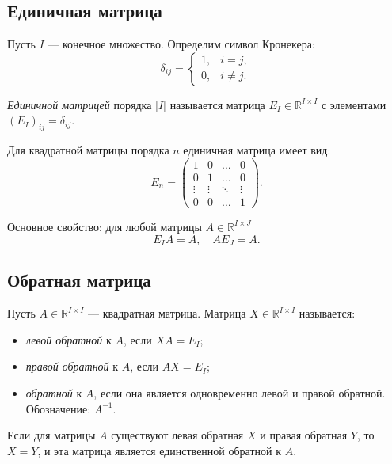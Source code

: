 \documentclass[a4paper,12pt]{article}
\theoremstyle{definition}
\theoremstyle{plain}
\theoremstyle{remark}
\begin{document}
	\subsection{Единичная матрица}
	
	Пусть \( I \) — конечное множество. Определим символ Кронекера:
	\[
	\delta_{ij} = 
	\begin{cases}
		1, & i = j, \\
		0, & i \neq j.
	\end{cases}
	\]
	
	\begin{tcolorbox}[colback=yellow!5, colframe=orange!50!black, title=Определение]
		\textit{Единичной матрицей} порядка \( |I| \) называется матрица \( E_I \in \mathbb{R}^{I \times I} \) с элементами \( (E_I)_{ij} = \delta_{ij} \).
	\end{tcolorbox}
	
	Для квадратной матрицы порядка \( n \) единичная матрица имеет вид:
	\[
	E_n = 
	\begin{pmatrix}
		1 & 0 & \dots & 0 \\
		0 & 1 & \dots & 0 \\
		\vdots & \vdots & \ddots & \vdots \\
		0 & 0 & \dots & 1
	\end{pmatrix}.
	\]
	
	Основное свойство: для любой матрицы \( A \in \mathbb{R}^{I \times J} \)
	\[
	E_I A = A, \quad A E_J = A.
	\]
	
	\subsection{Обратная матрица}
	
	\begin{tcolorbox}[colback=blue!5, colframe=blue!40!black, title=Определение]
		Пусть \( A \in \mathbb{R}^{I \times I} \) — квадратная матрица. Матрица \( X \in \mathbb{R}^{I \times I} \) называется:
		\begin{itemize}
			\item \textit{левой обратной} к \( A \), если \( XA = E_I \);
			\item \textit{правой обратной} к \( A \), если \( AX = E_I \);
			\item \textit{обратной} к \( A \), если она является одновременно левой и правой обратной. Обозначение: \( A^{-1} \).
		\end{itemize}
	\end{tcolorbox}
	
	\begin{tcolorbox}[colback=green!5, colframe=green!50!black, title=Свойство]
		Если для матрицы \( A \) существуют левая обратная \( X \) и правая обратная \( Y \), то \( X = Y \), и эта матрица является единственной обратной к \( A \).
	\end{tcolorbox}
	
\end{document}
